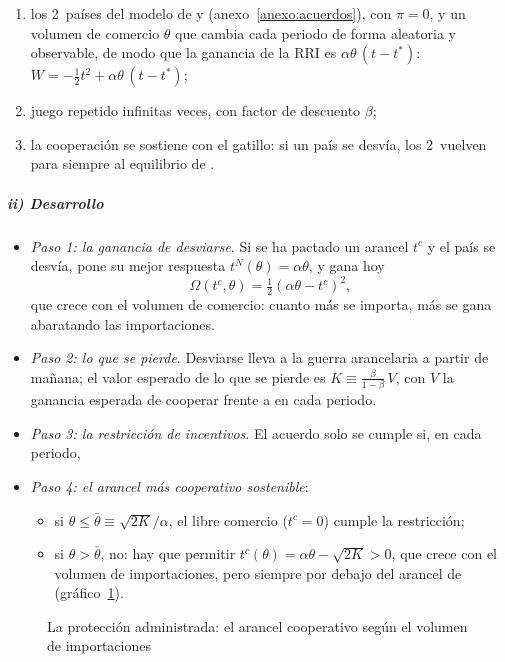 \documentclass[11pt]{article}
\begin{document}
\begin{enumerate}
\item los 2~países del modelo de  y  (anexo~\ref{anexo:acuerdos}), con $\pi=0$, y un volumen de comercio $\theta$ que cambia cada periodo de forma aleatoria y observable, de modo que la ganancia de la RRI es $\alpha\theta\,(t-t^*)$: $W=-\tfrac12t^2+\alpha\theta\,(t-t^*)$;
\item juego repetido infinitas veces, con factor de descuento $\beta$;
\item la cooperación se sostiene con el gatillo: si un país se desvía, los 2~vuelven para siempre al equilibrio de .
\end{enumerate}

\subparagraph{ii) Desarrollo}

\begin{itemize}
\item \emph{Paso 1: la ganancia de desviarse}. Si se ha pactado un arancel $t^c$ y el país se desvía, pone su mejor respuesta $t^N(\theta)=\alpha\theta$, y gana hoy
  \[\Omega(t^c,\theta)=\tfrac12\left(\alpha\theta-t^c\right)^2,\]
  que crece con el volumen de comercio: cuanto más se importa, más se gana abaratando las importaciones.
\item \emph{Paso 2: lo que se pierde}. Desviarse lleva a la guerra arancelaria a partir de mañana; el valor esperado de lo que se pierde es $K\equiv\frac{\beta}{1-\beta}\,V$, con $V$ la ganancia esperada de cooperar frente a  en cada periodo.
\item \emph{Paso 3: la restricción de incentivos}. El acuerdo solo se cumple si, en cada periodo,
\item \emph{Paso 4: el arancel más cooperativo sostenible}:
  \begin{itemize}
  \item si $\theta\leq\bar\theta\equiv\sqrt{2K}/\alpha$, el libre comercio ($t^c=0$) cumple la restricción;
  \item si $\theta>\bar\theta$, no: hay que permitir $t^c(\theta)=\alpha\theta-\sqrt{2K}>0$, que crece con el volumen de importaciones, pero siempre por debajo del arancel de  (gráfico~\ref{fig:escape}).
  \end{itemize}
\end{itemize}

\begin{figure}[H]
\centering
\caption{La protección administrada: el arancel cooperativo según el volumen de importaciones}\label{fig:escape}
\end{figure}
\end{document}
